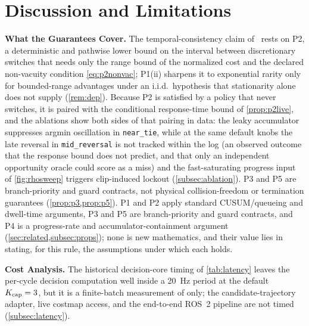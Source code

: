 \section{Discussion and Limitations}\label{sec:disc}

\noindent\textbf{What the Guarantees Cover.} The temporal-consistency claim of \sname\ rests on P2, a deterministic and pathwise lower bound on the interval between discretionary switches that needs only the range bound of the normalized cost and the declared non-vacuity condition \eqref{eq:p2nonvac}; P1(ii) sharpens it to exponential rarity only for bounded-range advantages under an i.i.d.\ hypothesis that stationarity alone does not supply (\cref{rem:dep}). Because P2 is satisfied by a policy that never switches, it is paired with the conditional response-time bound of \cref{prop:p2live}, and the ablations show both sides of that pairing in data: the leaky accumulator suppresses argmin oscillation in \texttt{near\_tie}, while at the same default knobs the late reversal in \texttt{mid\_reversal} is not tracked within the log (an observed outcome that the response bound does not predict, and that only an independent opportunity oracle could score as a miss) and the fast-saturating progress input of \cref{fig:rhosweep} triggers clip-induced lockout (\cref{subsec:ablation}). P3 and P5 are branch-priority and guard contracts, not physical collision-freedom or termination guarantees (\cref{prop:p3,prop:p5}). P1 and P2 apply standard CUSUM/queueing and dwell-time arguments, P3 and P5 are branch-priority and guard contracts, and P4 is a progress-rate and accumulator-containment argument (\cref{sec:related,subsec:props}); none is new mathematics, and their value lies in stating, for this rule, the assumptions under which each holds.

\noindent\textbf{Cost Analysis.} The historical decision-core timing of \cref{tab:latency} leaves the per-cycle decision computation well inside a 20~Hz period at the default $K_{\rm cap}=3$, but it is a finite-batch measurement of  only; the candidate-trajectory adapter, live costmap access, and the end-to-end ROS~2 pipeline are not timed (\cref{subsec:latency}).

